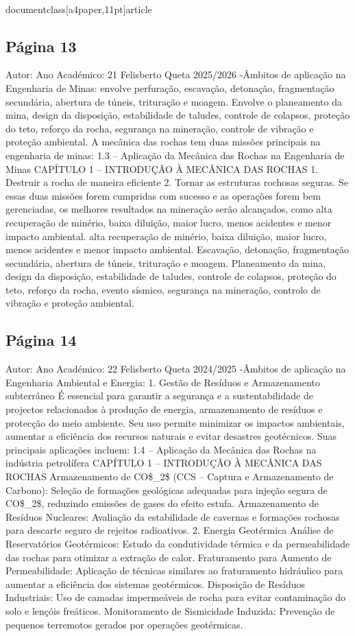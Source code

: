 \\documentclass[a4paper,11pt]{article}
\begin{document}
\subsection*{Página 13}
Autor:
Ano Académico:
21
Felisberto Queta
2025/2026
-Âmbitos de aplicação na Engenharia de Minas:
envolve perfuração, escavação, detonação, fragmentação secundária,
abertura de túneis, trituração e moagem.
Envolve o planeamento da mina, design da disposição, estabilidade de 
taludes, controle de colapsos, proteção do teto, reforço da rocha, 
segurança na mineração, controle de vibração e proteção ambiental.
A mecânica das rochas tem duas missões principais na engenharia de minas:
1.3 – Aplicação da Mecânica das Rochas na Engenharia de Minas
CAPÍTULO 1 – INTRODUÇÃO À MECÂNICA DAS ROCHAS
1. Destruir a rocha de maneira eficiente
2. Tornar as estruturas rochosas seguras.
Se essas duas missões forem cumpridas com sucesso e as operações forem bem gerenciadas, os melhores resultados na 
mineração serão alcançados, como alta recuperação de minério, baixa diluição, maior lucro, menos acidentes e menor 
impacto ambiental.
alta recuperação de 
minério, baixa 
diluição, maior lucro, 
menos acidentes e 
menor impacto 
ambiental.
Escavação, detonação, 
fragmentação 
secundária, abertura de 
túneis, trituração e 
moagem.
Planeamento da mina, 
design da disposição, 
estabilidade de taludes, 
controle de colapsos, 
proteção do teto, reforço 
da rocha, evento 
sísmico, segurança na 
mineração, controlo de 
vibração e proteção 
ambiental.



\subsection*{Página 14}
Autor:
Ano Académico:
22
Felisberto Queta
2024/2025
-Âmbitos de aplicação na Engenharia Ambiental e Energia:
1. Gestão de Resíduos e Armazenamento subterrâneo
É essencial para garantir a segurança e a sustentabilidade de projectos relacionados à produção de energia,
armazenamento de resíduos e protecção do meio ambiente. Seu uso permite minimizar os impactos ambientais, aumentar a
eficiência dos recursos naturais e evitar desastres geotécnicos. Suas principais aplicações incluem:
1.4 – Aplicação da Mecânica das Rochas na indústria petrolífera
CAPÍTULO 1 – INTRODUÇÃO À MECÂNICA DAS ROCHAS
Armazenamento de CO\$\_2\$ (CCS – Captura e Armazenamento de Carbono):
Seleção de formações geológicas adequadas para injeção segura de CO\$\_2\$, reduzindo emissões de gases do efeito estufa.
Armazenamento de Resíduos Nucleares:
Avaliação da estabilidade de cavernas e formações rochosas para descarte seguro de rejeitos radioativos.
2. Energia Geotérmica
Análise de Reservatórios Geotérmicos:
Estudo da condutividade térmica e da permeabilidade das rochas para otimizar a extração de calor.
Fraturamento para Aumento de Permeabilidade:
Aplicação de técnicas similares ao fraturamento hidráulico para aumentar a eficiência dos sistemas geotérmicos.
Disposição de Resíduos Industriais:
Uso de camadas impermeáveis de rocha para evitar contaminação do solo e lençóis freáticos.
Monitoramento de Sismicidade Induzida:
Prevenção de pequenos terremotos gerados por operações geotérmicas.
\end{document}
